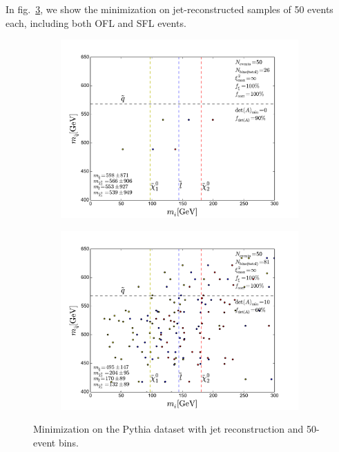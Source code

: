 \documentclass[twoside,english]{uiofysmaster}
\begin{document}
In fig.\ \ref{fig:event-pair-A-selection_pythia_4combosum-jetrec-OSFL-50events}, we show the minimization on jet-reconstructed samples of 50 events each, including both OFL and SFL events.
\begin{figure}[hbt]
	\centering
	\begin{subfigure}[b]{0.6\textwidth}
		\includegraphics[width=\textwidth]{figures/improving_combinatorics/pythia_jetrec_50evbins_nodetAcut-nosmear_TMP.pdf} 
		\caption{ }
		\label{fig:event-pair-A-selection_pythia_4combosum-jetrec-OSFL-50events_a}
	\end{subfigure}

	\begin{subfigure}[b]{0.6\textwidth}
		\includegraphics[width=\textwidth]{figures/improving_combinatorics/pythia_jetrec_50evbins_detAcut10-nosmear_TMP.pdf}
		\caption{ }
		\label{fig:event-pair-A-selection_pythia_4combosum-jetrec-OSFL-50events_b} 
	\end{subfigure}
	\caption{Minimization on the Pythia dataset with jet reconstruction and 50-event bins.}
	\label{fig:event-pair-A-selection_pythia_4combosum-jetrec-OSFL-50events}
\end{figure}
\end{document}

